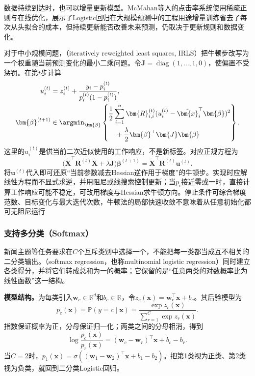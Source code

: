 数据持续到达时，也可以增量更新模型。McMahan等人的点击率系统使用稀疏正则与在线优化，展示了Logistic回归在大规模预测中的工程用途增量训练省去了每次从头拟合的成本，但持续更新能否改善未来预测，仍取决于更新规则和数据变化。

对于中小规模问题，（iteratively reweighted least squares, IRLS）把牛顿步改写为一个权重随当前预测变化的最小二乘问题。令$\bm{J}=\operatorname{diag}(1,\ldots,1,0)$，使偏置不受惩罚。在第$t$步计算
\begin{equation}
  \label{eq:classification-logistic-irls}
  \begin{aligned}
    u_i^{(t)}
      &=z_i^{(t)}
        +\frac{y_i-p_i^{(t)}}{p_i^{(t)}(1-p_i^{(t)})},\\
    \bm{\beta}^{(t+1)}
      &\in\argmin_{\bm{\beta}}\left\{
        \begin{aligned}
          &\frac12\sum_{i=1}^{n}\bm{R}_{i,i}^{(t)}
            (u_i^{(t)}-\tilde{\bm{x}}_i^{\top}\bm{\beta})^2\\
          &\quad{}+\frac{\lambda}{2}
            \bm{\beta}^{\top}\bm{J}\bm{\beta}
        \end{aligned}
      \right\}.
  \end{aligned}
\end{equation}
这里的$u_i^{(t)}$是供当前二次近似使用的工作响应，不是新标签。对应正规方程为
\[
  \bigl(\tilde{\bm{X}}^{\top}\bm{R}^{(t)}\tilde{\bm{X}}
       +\lambda\bm{J}\bigr)\bm{\beta}^{(t+1)}
  =\tilde{\bm{X}}^{\top}\bm{R}^{(t)}\bm{u}^{(t)}.
\]
将$\bm{u}^{(t)}$代入即可还原“当前参数减去Hessian逆作用于梯度”的牛顿步。实现时应解线性方程而不显式求逆，并用阻尼或线搜索控制更新；当$p_i$接近零或一时，直接计算工作响应可能不稳定，可改用梯度与Hessian求牛顿方向。停止条件可综合梯度范数、目标变化与最大迭代次数，牛顿法的局部快速收敛不意味着从任意初始化都可无阻尼运行

\subsubsection{支持多分类（Softmax）}
\label{sec:classification-logistic-softmax}

新闻主题等任务要求在$C$个互斥类别中选择一个，不能把每一类都当成互不相关的二分类输出。（softmax regression，也称multinomial logistic regression）同时建立各类得分，并将它们转成总和为一的概率；它保留的是“任意两类的对数概率比为线性函数”这一结构。

\textbf{模型结构。}为每类引入$\bm{w}_c\in\mathbb{R}^{d}$和$b_c\in\mathbb{R}$，令$z_c(\bm{x})=\bm{w}_c^{\top}\bm{x}+b_c$。其后验模型为
\begin{equation}
  \label{eq:classification-softmax-model}
  p_c(\bm{x})
  =\mathbb{P}(y=c\mid\bm{x})
  =\frac{\exp z_c(\bm{x})}
         {\sum_{r=1}^{C}\exp z_r(\bm{x})}.
\end{equation}
指数保证概率为正，分母保证归一化；两类之间的分母相消，得到
\[
  \log\frac{p_c(\bm{x})}{p_r(\bm{x})}
  =(\bm{w}_c-\bm{w}_r)^{\top}\bm{x}+b_c-b_r.
\]
当$C=2$时，$p_1(\bm{x})=\sigma((\bm{w}_1-\bm{w}_2)^{\top}\bm{x}+b_1-b_2)$。把第1类视为正类、第2类视为负类，就回到二分类Logistic回归。

